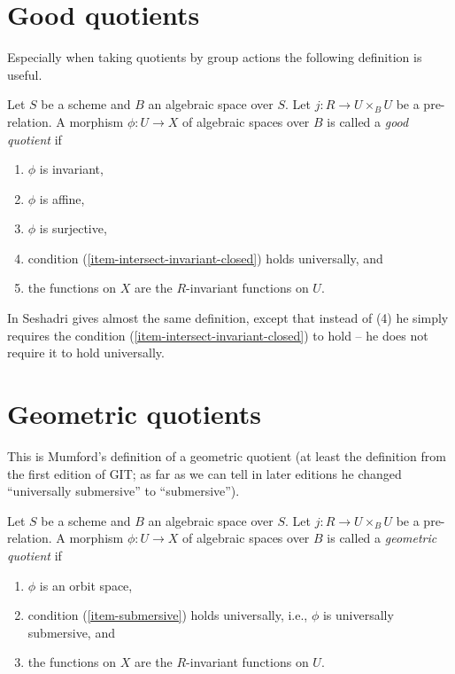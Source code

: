 \section{Good quotients}
\label{section-good}

\noindent
Especially when taking quotients by group actions the following definition
is useful. 

\begin{definition}
\label{definition-good}
Let $S$ be a scheme and $B$ an algebraic space over $S$.
Let $j : R \to U \times_B U$ be a pre-relation.
A morphism $\phi : U \to X$ of algebraic spaces over $B$
is called a {\it good quotient} if
\begin{enumerate}
\item $\phi$ is invariant,
\item $\phi$ is affine,
\item $\phi$ is surjective,
\item condition (\ref{item-intersect-invariant-closed}) holds universally, and
\item the functions on $X$ are the $R$-invariant functions on $U$.
\end{enumerate}
\end{definition}

\noindent
In \cite{seshadri_quotients} Seshadri gives almost the same definition,
except that instead of (4) he simply requires the condition
(\ref{item-intersect-invariant-closed}) to hold -- he does not require
it to hold universally.







\section{Geometric quotients}
\label{section-geometric}

\noindent
This is Mumford's definition of a geometric quotient (at least the definition
from the first edition of GIT; as far as we can tell in later editions he
changed ``universally submersive'' to ``submersive'').

\begin{definition}
\label{definition-geometric}
Let $S$ be a scheme and $B$ an algebraic space over $S$.
Let $j : R \to U \times_B U$ be a pre-relation.
A morphism $\phi : U \to X$ of algebraic spaces over $B$
is called a {\it geometric quotient} if
\begin{enumerate}
\item $\phi$ is an orbit space,
\item condition (\ref{item-submersive}) holds universally, i.e.,
$\phi$ is universally submersive, and
\item the functions on $X$ are the $R$-invariant functions on $U$.
\end{enumerate}
\end{definition}
















